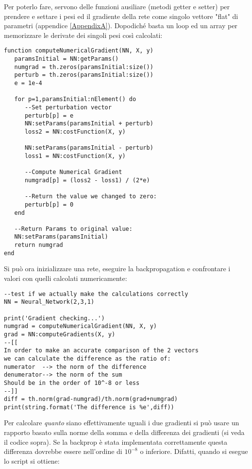 Per poterlo fare, servono delle funzioni ausiliare (metodi getter e setter) per prendere e settare i pesi ed il gradiente della rete come singolo vettore "flat" di parametri (appendice \ref{AppendixA}). Dopodiché basta un loop ed un array per memorizzare le derivate dei singoli pesi così calcolati:

\begin{lstlisting}[language={[5.2]Lua}]
function computeNumericalGradient(NN, X, y)
   paramsInitial = NN:getParams()
   numgrad = th.zeros(paramsInitial:size())
   perturb = th.zeros(paramsInitial:size())
   e = 1e-4

   for p=1,paramsInitial:nElement() do
      --Set perturbation vector
      perturb[p] = e
      NN:setParams(paramsInitial + perturb)
      loss2 = NN:costFunction(X, y)

      NN:setParams(paramsInitial - perturb)
      loss1 = NN:costFunction(X, y)

      --Compute Numerical Gradient
      numgrad[p] = (loss2 - loss1) / (2*e)

      --Return the value we changed to zero:
      perturb[p] = 0
   end

   --Return Params to original value:
   NN:setParams(paramsInitial)
   return numgrad
end
\end{lstlisting}
Si può ora inizializzare una rete, eseguire la backpropagation e confrontare i valori con quelli calcolati numericamente:
\begin{lstlisting}[language={[5.2]Lua}]
--test if we actually make the calculations correctly
NN = Neural_Network(2,3,1)

print('Gradient checking...')
numgrad = computeNumericalGradient(NN, X, y)
grad = NN:computeGradients(X, y)
--[[
In order to make an accurate comparison of the 2 vectors
we can calculate the difference as the ratio of:
numerator  --> the norm of the difference
denumerator--> the norm of the sum
Should be in the order of 10^-8 or less
--]]
diff = th.norm(grad-numgrad)/th.norm(grad+numgrad)
print(string.format('The difference is %e',diff))
\end{lstlisting}

Per calcolare \emph{quanto} siano effettivamente uguali i due gradienti si può usare un rapporto basato sulla norme della somma e della differenza dei gradienti (si veda il codice sopra). Se la backprop è stata implementata correttamente questa differenza dovrebbe essere nell'ordine di $10^{-8}$ o inferiore. Difatti, quando si esegue lo script si ottiene:


